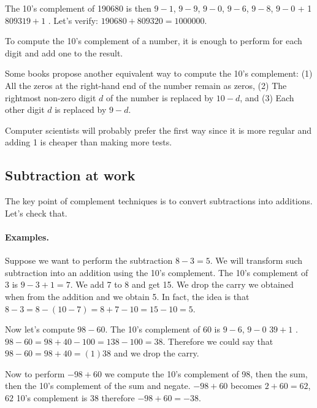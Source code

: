 \documentclass[a4paper,10pt,twoside]{book}
\begin{document}
The 10's complement of 190680 is then $9-1$, $9-9$, $9-0$, $9-6$, $9-8$, $9-0$ + 1 \ie $809319 + 1$ . Let's verify: $190680 + 809320 = 1000000$.
 
To compute the 10's complement of a number, it is enough to perform  for each digit and add one to the result.


Some books propose another equivalent way to compute the 10's complement: 
(1) All the zeros at the right-hand end of the number remain as zeros, 
(2) The rightmost non-zero digit $d$ of the number is replaced by $10 - d$, and
(3) Each other digit $d$ is replaced by $9 - d$. 

Computer scientists will probably prefer the first way since it is more regular and adding 1 is cheaper than making more tests.




\subsection{Subtraction at work}
The key point of complement techniques is to convert subtractions into additions. Let's check that.

\paragraph{Examples.}
Suppose we want to perform the subtraction $8 - 3 = 5$. We will transform such subtraction into an addition using the 10's complement. The 10's complement of 3 is $9 - 3 + 1 = 7$. We add 7 to 8 and get 15. 
We drop the carry we obtained when from the addition and we obtain 5. In fact, the idea is that $8-3=8-(10-7)=8+7-10=15-10=5$.


Now let's compute $98-60$. The 10's complement of 60 is $9-6$, $9-0$ \ie $39 + 1$ . $98-60 = 98 + 40 - 100 = 138 - 100 = 38$. 
Therefore we could say that $98-60=98+40=(1)38$ and we drop the carry. 

Now to perform $-98+60$ we compute the 10's complement of 98, then the sum, then the 10's complement of the sum and negate. \ie$-98+60$ becomes $2+60=62$, $62$ 10's complement is 38 therefore $-98+60=-38$.
\end{document}
